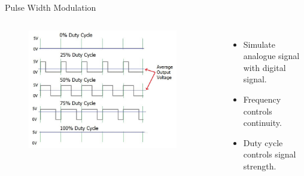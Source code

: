 \documentclass[12pt,letterpaper]{beamer}
\begin{document}
\begin{frame}{Pulse Width Modulation}
    \begin{columns}
        \begin{figure}
            \includegraphics[width=0.9\textwidth]{pwm}
        \end{figure}

        {\scriptsize
            \begin{itemize}
                \item Simulate analogue signal with digital signal.
                \item Frequency controls continuity.
                \item Duty cycle controls signal strength. 
            \end{itemize}
        }

    \end{columns}

\end{frame}
\end{document}
